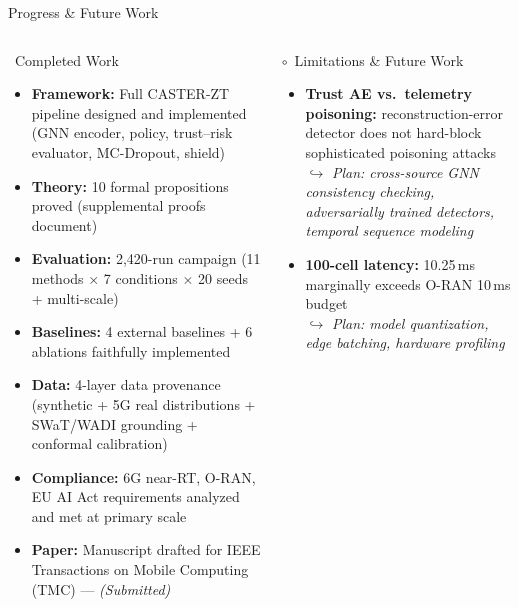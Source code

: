 \documentclass[aspectratio=169,10pt]{beamer}
\newcommand{\cmark}{\textcolor{tealgreen}{\ding{51}}}
\newcommand{\pmark}{\textcolor{alertorange}{$\circ$}}
\newcommand{\tightlist}{\setlength{\itemsep}{2pt}\setlength{\parskip}{0pt}\setlength{\topsep}{0pt}}
\begin{document}
\begin{frame}[t,shrink=35]{Progress \& Future Work}{}
  \begin{columns}[t]
    \begin{exampleblock}{\cmark\ Completed Work}
      \begin{itemize}\tightlist
        \item \textbf{Framework:} Full CASTER-ZT pipeline designed and implemented (GNN encoder, policy, trust–risk evaluator, MC-Dropout, shield)
        \item \textbf{Theory:} 10 formal propositions proved (supplemental proofs document)
        \item \textbf{Evaluation:} 2,420-run campaign (11 methods $\times$ 7 conditions $\times$ 20 seeds + multi-scale)
        \item \textbf{Baselines:} 4 external baselines + 6 ablations faithfully implemented
        \item \textbf{Data:} 4-layer data provenance (synthetic + 5G real distributions + SWaT/WADI grounding + conformal calibration)
        \item \textbf{Compliance:} 6G near-RT, O-RAN, EU AI Act requirements analyzed and met at primary scale
        \item \textbf{Paper:} Manuscript drafted for IEEE Transactions on Mobile Computing (TMC) — \textit{(Submitted)}
      \end{itemize}
    \end{exampleblock}
    \begin{alertblock}{\pmark\ Limitations \& Future Work}
      \begin{itemize}\tightlist
        \item \textbf{Trust AE vs.\ telemetry poisoning:} reconstruction-error detector does not hard-block sophisticated poisoning attacks \cite{pang2021deep,kravchik2022efficient}\\
              $\hookrightarrow$ \textit{Plan: cross-source GNN consistency checking, adversarially trained detectors, temporal sequence modeling}
        \item \textbf{100-cell latency:} 10.25\,ms marginally exceeds O-RAN 10\,ms budget\\
              $\hookrightarrow$ \textit{Plan: model quantization, edge batching, hardware profiling}

\end{itemize}
\end{alertblock}
\end{columns}
\end{frame}
\end{document}
